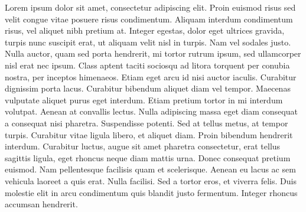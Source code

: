 \documentclass{ppgccufscar}
\begin{document}
 

\capa
\folhaderosto

\begin{agradecimentos}

\end{agradecimentos}

\begin{resumo}
Lorem ipsum dolor sit amet, consectetur adipiscing elit. Proin euismod risus sed velit congue vitae posuere risus condimentum. Aliquam interdum condimentum risus, vel aliquet nibh pretium at. Integer egestas, dolor eget ultrices gravida, turpis nunc suscipit erat, ut aliquam velit nisl in turpis. Nam vel sodales justo. Nulla auctor, quam sed porta hendrerit, mi tortor rutrum ipsum, sed ullamcorper nisl erat nec ipsum. Class aptent taciti sociosqu ad litora torquent per conubia nostra, per inceptos himenaeos. Etiam eget arcu id nisi auctor iaculis. Curabitur dignissim porta lacus. Curabitur bibendum aliquet diam vel tempor. Maecenas vulputate aliquet purus eget interdum. Etiam pretium tortor in mi interdum volutpat. Aenean at convallis lectus. Nulla adipiscing massa eget diam consequat a consequat nisi pharetra. Suspendisse potenti. Sed at tellus metus, at tempor turpis. Curabitur vitae ligula libero, et aliquet diam. Proin bibendum hendrerit interdum. Curabitur luctus, augue sit amet pharetra consectetur, erat tellus sagittis ligula, eget rhoncus neque diam mattis urna. Donec consequat pretium euismod. Nam pellentesque facilisis quam et scelerisque. Aenean eu lacus ac sem vehicula laoreet a quis erat. Nulla facilisi. Sed a tortor eros, et viverra felis. Duis molestie elit in arcu condimentum quis blandit justo fermentum. Integer rhoncus accumsan hendrerit.
\end{resumo}
\end{document}
